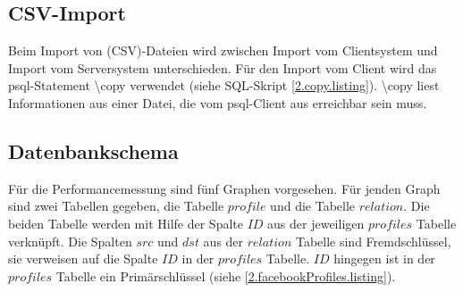 \subsection{CSV-Import}
Beim Import von (CSV)-Dateien wird zwischen Import vom Clientsystem und  Import vom Serversystem unterschieden.
Für den Import vom Client wird das psql-Statement \textbackslash copy verwendet (siehe SQL-Skript \ref{2.copy.listing}).
\textbackslash copy liest Informationen aus einer Datei,
die vom psql-Client aus erreichbar sein muss. \cite{postgres2018}

\subsection{Datenbankschema}
Für die Performancemessung sind fünf Graphen vorgesehen.
Für jenden Graph sind zwei Tabellen gegeben, die Tabelle $profile$ und die Tabelle $relation$.
Die beiden Tabelle werden mit Hilfe der Spalte $ID$ aus der jeweiligen $profiles$ Tabelle verknüpft.
Die Spalten $src$ und $dst$ aus der $relation$ Tabelle sind Fremdschlüssel, sie verweisen auf die Spalte $ID$ in der $profiles$ Tabelle.
$ID$ hingegen ist in der $profiles$ Tabelle ein Primärschlüssel (siehe \ref{2.facebookProfiles.listing}).

